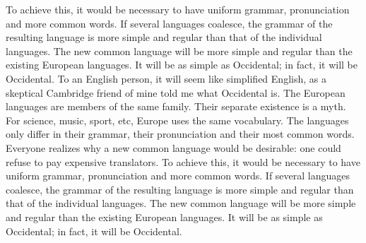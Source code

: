 To achieve this, it would be necessary to have uniform grammar, pronunciation and more common words. If several languages coalesce, the grammar of the resulting language is more simple and regular than that of the individual languages. The new common language will be more simple and regular than the existing European languages. It will be as simple as Occidental; in fact, it will be Occidental. To an English person, it will seem like simplified English, as a skeptical Cambridge friend of mine told me what Occidental is. The European languages are members of the same family. Their separate existence is a myth. For science, music, sport, etc, Europe uses the same vocabulary. The languages only differ in their grammar, their pronunciation and their most common words. Everyone realizes why a new common language would be desirable: one could refuse to pay expensive translators. To achieve this, it would be necessary to have uniform grammar, pronunciation and more common words. If several languages coalesce, the grammar of the resulting language is more simple and regular than that of the individual languages. The new common language will be more simple and regular than the existing European languages. It will be as simple as Occidental; in fact, it will be Occidental.




